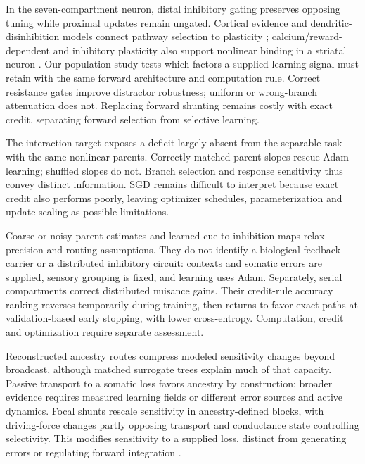 \documentclass[11pt]{article}
\begin{document}
In the seven-compartment neuron, distal inhibitory gating preserves opposing tuning while proximal updates remain ungated. Cortical evidence and dendritic-disinhibition models connect pathway selection to plasticity \citep{mante2013context,yang2016gating}; calcium/reward-dependent and inhibitory plasticity also support nonlinear binding in a striatal neuron \citep{khodadadi2025binding}. Our population study tests which factors a supplied learning signal must retain with the same forward architecture and computation rule. Correct resistance gates improve distractor robustness; uniform or wrong-branch attenuation does not. Replacing forward shunting remains costly with exact credit, separating forward selection from selective learning.

The interaction target exposes a deficit largely absent from the separable task with the same nonlinear parents. Correctly matched parent slopes rescue Adam learning; shuffled slopes do not. Branch selection and response sensitivity thus convey distinct information. SGD remains difficult to interpret because exact credit also performs poorly, leaving optimizer schedules, parameterization and update scaling as possible limitations.

Coarse or noisy parent estimates and learned cue-to-inhibition maps relax precision and routing assumptions. They do not identify a biological feedback carrier or a distributed inhibitory circuit: contexts and somatic errors are supplied, sensory grouping is fixed, and learning uses Adam. Separately, serial compartments correct distributed nuisance gains. Their credit-rule accuracy ranking reverses temporarily during training, then returns to favor exact paths at validation-based early stopping, with lower cross-entropy. Computation, credit and optimization require separate assessment.

Reconstructed ancestry routes compress modeled sensitivity changes beyond broadcast, although matched surrogate trees explain much of that capacity. Passive transport to a somatic loss favors ancestry by construction; broader evidence requires measured learning fields or different error sources and active dynamics. Focal shunts rescale sensitivity in ancestry-defined blocks, with driving-force changes partly opposing transport and conductance state controlling selectivity. This modifies sensitivity to a supplied loss, distinct from generating errors or regulating forward integration \citep{rossbroich2023disinhibitory,galloni2026cellular,greedy2026celltype,safaai2026gainload}.
\end{document}
